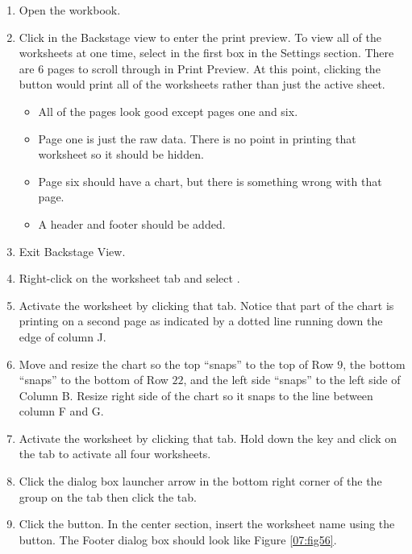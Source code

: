 \begin{enumerate}
	\item Open the  workbook.
	\item Click  in the Backstage view to enter the print preview. To view all of the worksheets at one time, select  in the first box in the Settings section. There are $ 6 $ pages to scroll through in Print Preview. At this point, clicking the  button would print all of the worksheets rather than just the active sheet.

	\begin{itemize}
		\item All of the pages look good except pages one and six.
		\item Page one is just the raw data. There is no point in printing that worksheet so it should be hidden.
		\item Page six should have a chart, but there is something wrong with that page.
		\item A header and footer should be added.
	\end{itemize}

	\item Exit Backstage View.
	\item Right-click on the  worksheet tab and select .
	\item Activate the  worksheet by clicking that tab. Notice that part of the chart is printing on a second page as indicated by a dotted line running down the edge of column J. 
	\item Move and resize the chart so the top ``snaps'' to the top of Row $ 9 $, the bottom ``snaps'' to the bottom of Row $ 22 $, and the left side ``snaps'' to the left side of Column B. Resize right side of the chart so it snaps to the line between column F and G.
	\item Activate the  worksheet by clicking that tab. Hold down the  key and click on the  tab to activate all four worksheets.
	\item Click the  dialog box launcher arrow in the bottom right corner of the the  group on the  tab then click the  tab.
	\item Click the  button. In the center section, insert the worksheet name using the  button. The Footer dialog box should look like Figure \ref{07:fig56}.
\end{enumerate}

